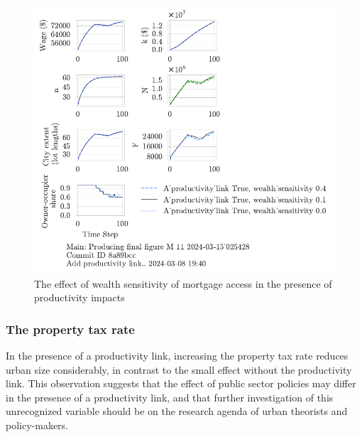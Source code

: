 \begin{figure}[h!bt]
    \centering
    \includegraphics[scale=.8, trim={0 1.4cm 0 0},clip]{fig/With-productivity_link-wealth_sensitivity-025428.pdf}
    \caption{The effect of wealth sensitivity of mortgage access in the presence of productivity impacts}
    \label{fig:Productivity_link_and_wealth_sensitivity_ownership_trajectory}
\end{figure}

\newpage

\subsubsection{The property tax rate}

In the presence of a productivity link, increasing the property tax rate reduces urban size considerably, in contrast to the small effect without the productivity link. This observation suggests that the effect of public sector policies may differ in the presence of a productivity link, and that further investigation of this unrecognized variable should be on the research agenda of urban theorists and policy-makers.

